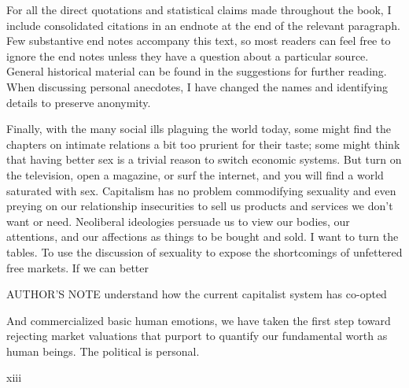  \par 
For all the direct quotations and statistical claims made throughout the book, I include consolidated citations in an endnote at the end of the relevant paragraph. Few substantive end notes accompany this text, so most readers can feel free to ignore the end notes unless they have a question about a particular source. General historical material can be found in the suggestions for further reading. When discussing personal anecdotes, I have changed the names and identifying details to preserve anonymity.
 \par 
Finally, with the many social ills plaguing the world today, some might find the chapters on intimate relations a bit too prurient for their taste; some might think that having better sex is a trivial reason to switch economic systems. But turn on the television, open a magazine, or surf the internet, and you will find a world saturated with sex. Capitalism has no problem commodifying sexuality and even preying on our relationship insecurities to sell us products and services we don't want or need. Neoliberal ideologies persuade us to view our bodies, our attentions, and our affections as things to be bought and sold. I want to turn the tables. To use the discussion of sexuality to expose the shortcomings of unfettered free markets. If we can better
 \par 
AUTHOR'S NOTE understand how the current capitalist system has co-opted
 \par 
And commercialized basic human emotions, we have taken the first step toward rejecting market valuations that purport to quantify our fundamental worth as human beings. The political is personal.
 \par 
xiii